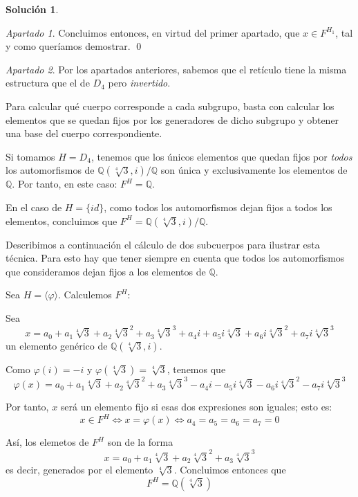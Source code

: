 \documentclass[a4paper, 11pt]{article}
\theoremstyle{definition}
\newtheorem*{solucion}{Solución}
\theoremstyle{remark}
\newtheorem{apartado}{Apartado}[ejercicio]
\begin{document}
\begin{solucion}
\begin{apartado}
          Concluimos entonces, en virtud del primer apartado, que $x \in F^{H_1}$, tal y como queríamos demostrar. \qed
      \end{apartado}

      \begin{apartado}
          Por los apartados anteriores, sabemos que el retículo tiene la misma estructura que el de $D_4$ pero \emph{invertido}.

          Para calcular qué cuerpo corresponde a cada subgrupo, basta con calcular los elementos que se quedan fijos por los generadores de dicho subgrupo y obtener una base del cuerpo correspondiente.

          Si tomamos $H = D_4$, tenemos que los únicos elementos que quedan fijos por \emph{todos} los automorfismos de $\mathbb{Q}(\sqrt[4]{3},i)/\mathbb{Q}$ son única y exclusivamente los elementos de $\mathbb{Q}$. Por tanto, en este caso: $F^H = \mathbb{Q}$.

          En el caso de $H = \{id\}$, como todos los automorfismos dejan fijos a todos los elementos, concluimos que $F^H = \mathbb{Q}(\sqrt[4]{3},i)/\mathbb{Q}$.

          Describimos a continuación el cálculo de dos subcuerpos para ilustrar esta técnica. Para esto hay que tener siempre en cuenta que todos los automorfismos que consideramos dejan fijos a los elementos de $\mathbb{Q}$.

          Sea $H=\langle \varphi \rangle$. Calculemos $F^H$:

          Sea
          \[
          x = a_0 + a_1 \sqrt[4]{3} + a_2 \sqrt[4]{3}^2 + a_3 \sqrt[4]{3}^3 + a_4 i + a_5 i \sqrt[4]{3} + a_6 i \sqrt[4]{3}^2 + a_7 i \sqrt[4]{3}^3
          \]
          un elemento genérico de $\mathbb{Q}(\sqrt[4]{3},i)$.

          Como $\varphi(i)=-i$ y $\varphi(\sqrt[4]{3})=\sqrt[4]{3}$, tenemos que
          \[
          \varphi(x) = a_0 + a_1 \sqrt[4]{3} + a_2 \sqrt[4]{3}^2 + a_3 \sqrt[4]{3}^3 - a_4 i - a_5 i \sqrt[4]{3} - a_6 i \sqrt[4]{3}^2 - a_7 i \sqrt[4]{3}^3
          \]

          Por tanto, $x$ será un elemento fijo si esas dos expresiones son iguales; esto es:
          \[
          x \in F^H \iff x = \varphi(x) \iff a_4 = a_5 = a_6 = a_7 = 0
          \]

          Así, los elemetos de $F^H$ son de la forma
          \[
          x = a_0 + a_1 \sqrt[4]{3} + a_2 \sqrt[4]{3}^2 + a_3 \sqrt[4]{3}^3
          \]
          es decir, generados por el elemento $\sqrt[4]{3}$. Concluimos entonces que \[F^H = \mathbb{Q}(\sqrt[4]{3})\]


\end{apartado}
\end{solucion}
\end{document}
